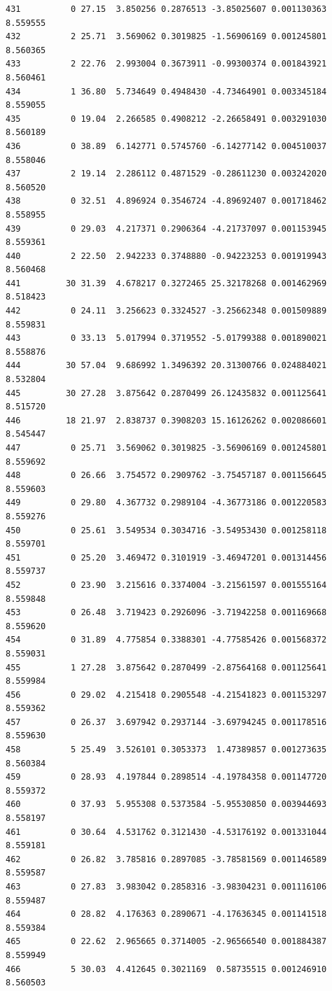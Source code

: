 \documentclass[]{book}
\theoremstyle{definition}
\theoremstyle{definition}
\theoremstyle{definition}
\theoremstyle{remark}
\begin{document}
\begin{verbatim}
431          0 27.15  3.850256 0.2876513 -3.85025607 0.001130363 8.559555
432          2 25.71  3.569062 0.3019825 -1.56906169 0.001245801 8.560365
433          2 22.76  2.993004 0.3673911 -0.99300374 0.001843921 8.560461
434          1 36.80  5.734649 0.4948430 -4.73464901 0.003345184 8.559055
435          0 19.04  2.266585 0.4908212 -2.26658491 0.003291030 8.560189
436          0 38.89  6.142771 0.5745760 -6.14277142 0.004510037 8.558046
437          2 19.14  2.286112 0.4871529 -0.28611230 0.003242020 8.560520
438          0 32.51  4.896924 0.3546724 -4.89692407 0.001718462 8.558955
439          0 29.03  4.217371 0.2906364 -4.21737097 0.001153945 8.559361
440          2 22.50  2.942233 0.3748880 -0.94223253 0.001919943 8.560468
441         30 31.39  4.678217 0.3272465 25.32178268 0.001462969 8.518423
442          0 24.11  3.256623 0.3324527 -3.25662348 0.001509889 8.559831
443          0 33.13  5.017994 0.3719552 -5.01799388 0.001890021 8.558876
444         30 57.04  9.686992 1.3496392 20.31300766 0.024884021 8.532804
445         30 27.28  3.875642 0.2870499 26.12435832 0.001125641 8.515720
446         18 21.97  2.838737 0.3908203 15.16126262 0.002086601 8.545447
447          0 25.71  3.569062 0.3019825 -3.56906169 0.001245801 8.559692
448          0 26.66  3.754572 0.2909762 -3.75457187 0.001156645 8.559603
449          0 29.80  4.367732 0.2989104 -4.36773186 0.001220583 8.559276
450          0 25.61  3.549534 0.3034716 -3.54953430 0.001258118 8.559701
451          0 25.20  3.469472 0.3101919 -3.46947201 0.001314456 8.559737
452          0 23.90  3.215616 0.3374004 -3.21561597 0.001555164 8.559848
453          0 26.48  3.719423 0.2926096 -3.71942258 0.001169668 8.559620
454          0 31.89  4.775854 0.3388301 -4.77585426 0.001568372 8.559031
455          1 27.28  3.875642 0.2870499 -2.87564168 0.001125641 8.559984
456          0 29.02  4.215418 0.2905548 -4.21541823 0.001153297 8.559362
457          0 26.37  3.697942 0.2937144 -3.69794245 0.001178516 8.559630
458          5 25.49  3.526101 0.3053373  1.47389857 0.001273635 8.560384
459          0 28.93  4.197844 0.2898514 -4.19784358 0.001147720 8.559372
460          0 37.93  5.955308 0.5373584 -5.95530850 0.003944693 8.558197
461          0 30.64  4.531762 0.3121430 -4.53176192 0.001331044 8.559181
462          0 26.82  3.785816 0.2897085 -3.78581569 0.001146589 8.559587
463          0 27.83  3.983042 0.2858316 -3.98304231 0.001116106 8.559487
464          0 28.82  4.176363 0.2890671 -4.17636345 0.001141518 8.559384
465          0 22.62  2.965665 0.3714005 -2.96566540 0.001884387 8.559949
466          5 30.03  4.412645 0.3021169  0.58735515 0.001246910 8.560503

\end{verbatim}
\end{document}
